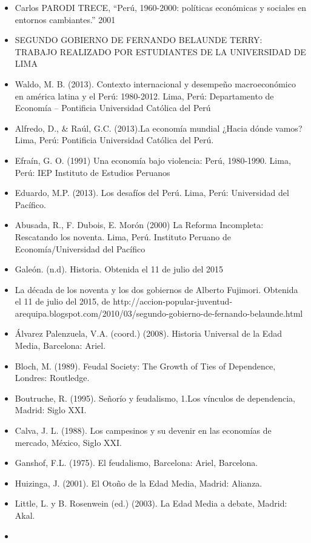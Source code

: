 \documentclass[
  jou,
  floatsintext,
  longtable,
  a4paper,
  nolmodern,
  notxfonts,
  notimes,
  colorlinks=true,linkcolor=blue,citecolor=blue,urlcolor=blue]{apa7}
\begin{document}
\begin{itemize}
\item
  Carlos PARODI TRECE, ``Perú, 1960-2000: políticas económicas y
  sociales en entornos cambiantes.'' 2001
\item
  SEGUNDO GOBIERNO DE FERNANDO BELAUNDE TERRY: TRABAJO REALIZADO POR
  ESTUDIANTES DE LA UNIVERSIDAD DE LIMA
\item
  Waldo, M. B. (2013). Contexto internacional y desempeño macroeconómico
  en américa latina y el Perú: 1980-2012. Lima, Perú: Departamento de
  Economía -- Pontificia Universidad Católica del Perú
\item
  Alfredo, D., \& Raúl, G.C. (2013).La economía mundial ¿Hacia dónde
  vamos? Lima, Perú: Pontificia Universidad Católica del Perú.
\item
  Efraín, G. O. (1991) Una economía bajo violencia: Perú, 1980-1990.
  Lima, Perú: IEP Instituto de Estudios Peruanos
\item
  Eduardo, M.P. (2013). Los desafíos del Perú. Lima, Perú: Universidad
  del Pacífico.
\item
  Abusada, R., F. Dubois, E. Morón (2000) La Reforma Incompleta:
  Rescatando los noventa. Lima, Perú. Instituto Peruano de
  Economía/Universidad del Pacífico
\item
  Galeón. (n.d). Historia. Obtenida el 11 de julio del 2015
\item
  La década de los noventa y los dos gobiernos de Alberto Fujimori.
  Obtenida el 11 de julio del 2015, de
  http://accion-popular-juventud-arequipa.blogspot.com/2010/03/segundo-gobierno-de-fernando-belaunde.html
\item
  Álvarez Palenzuela, V.A. (coord.) (2008). Historia Universal de la
  Edad Media, Barcelona: Ariel.
\item
  Bloch, M. (1989). Feudal Society: The Growth of Ties of Dependence,
  Londres: Routledge.
\item
  Boutruche, R. (1995). Señorío y feudalismo, 1.Los vínculos de
  dependencia, Madrid: Siglo XXI.
\item
  Calva, J. L. (1988). Los campesinos y su devenir en las economías de
  mercado, México, Siglo XXI.
\item
  Ganshof, F.L. (1975). El feudalismo, Barcelona: Ariel, Barcelona.
\item
  Huizinga, J. (2001). El Otoño de la Edad Media, Madrid: Alianza.
\item
  Little, L. y B. Rosenwein (ed.) (2003). La Edad Media a debate,
  Madrid: Akal.
\item

\end{itemize}
\end{document}
